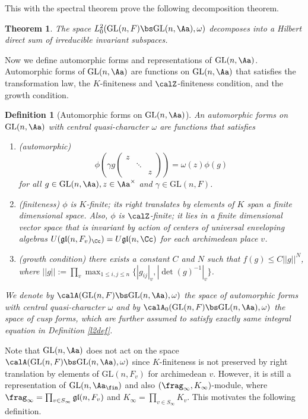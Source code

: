 \documentclass{article}
\newtheorem{theorem}{Theorem}[section]
\newtheorem{definition}{Definition}[section]
\newcommand{\GL}{\mathrm{GL}}
\begin{document}
This with the spectral theorem prove the following decomposition theorem. 

\begin{theorem}
\label{cuspdecomad}
The space $L_{0}^{2} (\GL(n, F) \bs \GL(n, \Aa), \omega)$ decomposes into a Hilbert direct sum of irreducible invariant subspaces. 
\end{theorem}


Now we define automorphic forms and representations of $\GL(n, \Aa)$. 
Automorphic forms of $\GL(n, \Aa)$ are functions on $\GL(n, \Aa)$ that satisfies the transformation law, the $K$-finiteness and $\calZ$-finiteness condition, and the growth condition. 
\begin{definition}[Automorphic forms on $\GL(n, \Aa)$]
An automorphic forms on $\GL(n, \Aa)$ with central quasi-character $\omega$ are functions that satisfies 
\begin{enumerate}
\item (automorphic) 
$$
\phi\left( \gamma g\begin{pmatrix} z & & \\ & \ddots & \\  & & z\end{pmatrix} \right) = \omega(z)\phi(g)
$$
for all $g\in \GL(n, \Aa), z\in \Aa^{\times}$ and $\gamma\in \GL(n, F)$. 
\item (finiteness) $\phi$ is $K$-finite; its right translates by elements of $K$ span a finite dimensional space. Also, $\phi$ is $\calZ$-finite; it lies in a finite dimensional vector space that is invariant by action of centers of universal enveloping algebras $U(\mathfrak{gl}(n, F_{v})_{\Cc}) = U\mathfrak{gl}(n, \Cc)$ for each archimedean place $v$. 
\item (growth condition) there exists a constant $C$ and $N$ such that $f(g) \leq C||g||^{N}$, where $||g|| := \prod_{v} \max_{1\leq i, j\leq n}\{ |g_{ij}|_{v}, |\det(g)^{-1}|_{v}\}$. 
\end{enumerate}
We denote by $\calA(\GL(n, F)\bs \GL(n, \Aa), \omega)$ the space of automorphic forms with central quasi-character $\omega$ and by $\calA_{0}(\GL(n, F)\bs \GL(n, \Aa), \omega)$ the space of cusp forms, which are further assumed to satisfy exactly same integral equation in Definition \ref{l2def}. 
\end{definition}

Note that $\GL(n, \Aa)$ does not act on the space $\calA(\GL(n, F)\bs \GL(n, \Aa), \omega)$ since $K$-finiteness is not preserved by right translation by elements of $\GL(n, F_{v})$ for archimedean $v$. 
However, it is still a representation of $\GL(n, \Aa_{\fin})$ and also $(\frag_{\infty}, K_{\infty})$-module, where $\frag_{\infty} = \prod_{v\in S_{\infty}}\mathfrak{gl}(n, F_{v})$ and $K_{\infty} = \prod_{v\in S_{\infty}} K_{v}$. 
This motivates the following definition. 
\end{document}
